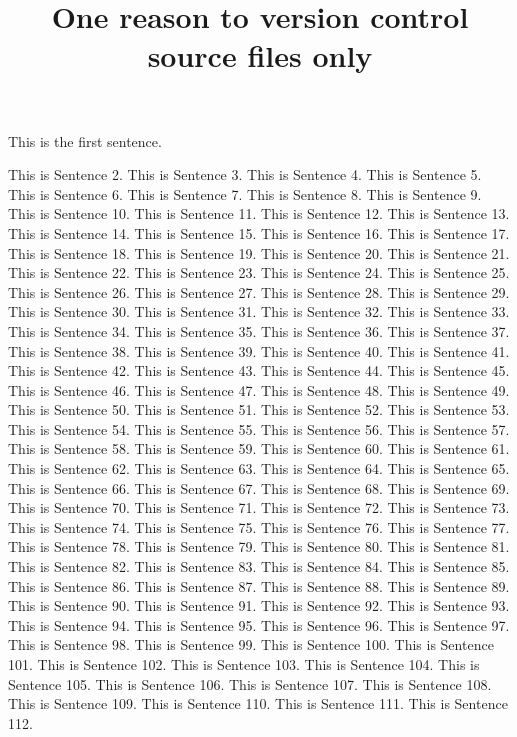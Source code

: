 \documentclass{article}
\title{One reason to version control source files only}
\begin{document}
\maketitle

This is the first sentence.

This is Sentence 2.
This is Sentence 3.
This is Sentence 4.
This is Sentence 5.
This is Sentence 6.
This is Sentence 7.
This is Sentence 8.
This is Sentence 9.
This is Sentence 10.
This is Sentence 11.
This is Sentence 12.
This is Sentence 13.
This is Sentence 14.
This is Sentence 15.
This is Sentence 16.
This is Sentence 17.
This is Sentence 18.
This is Sentence 19.
This is Sentence 20.
This is Sentence 21.
This is Sentence 22.
This is Sentence 23.
This is Sentence 24.
This is Sentence 25.
This is Sentence 26.
This is Sentence 27.
This is Sentence 28.
This is Sentence 29.
This is Sentence 30.
This is Sentence 31.
This is Sentence 32.
This is Sentence 33.
This is Sentence 34.
This is Sentence 35.
This is Sentence 36.
This is Sentence 37.
This is Sentence 38.
This is Sentence 39.
This is Sentence 40.
This is Sentence 41.
This is Sentence 42.
This is Sentence 43.
This is Sentence 44.
This is Sentence 45.
This is Sentence 46.
This is Sentence 47.
This is Sentence 48.
This is Sentence 49.
This is Sentence 50.
This is Sentence 51.
This is Sentence 52.
This is Sentence 53.
This is Sentence 54.
This is Sentence 55.
This is Sentence 56.
This is Sentence 57.
This is Sentence 58.
This is Sentence 59.
This is Sentence 60.
This is Sentence 61.
This is Sentence 62.
This is Sentence 63.
This is Sentence 64.
This is Sentence 65.
This is Sentence 66.
This is Sentence 67.
This is Sentence 68.
This is Sentence 69.
This is Sentence 70.
This is Sentence 71.
This is Sentence 72.
This is Sentence 73.
This is Sentence 74.
This is Sentence 75.
This is Sentence 76.
This is Sentence 77.
This is Sentence 78.
This is Sentence 79.
This is Sentence 80.
This is Sentence 81.
This is Sentence 82.
This is Sentence 83.
This is Sentence 84.
This is Sentence 85.
This is Sentence 86.
This is Sentence 87.
This is Sentence 88.
This is Sentence 89.
This is Sentence 90.
This is Sentence 91.
This is Sentence 92.
This is Sentence 93.
This is Sentence 94.
This is Sentence 95.
This is Sentence 96.
This is Sentence 97.
This is Sentence 98.
This is Sentence 99.
This is Sentence 100.
This is Sentence 101.
This is Sentence 102.
This is Sentence 103.
This is Sentence 104.
This is Sentence 105.
This is Sentence 106.
This is Sentence 107.
This is Sentence 108.
This is Sentence 109.
This is Sentence 110.
This is Sentence 111.
This is Sentence 112.
\end{document}
